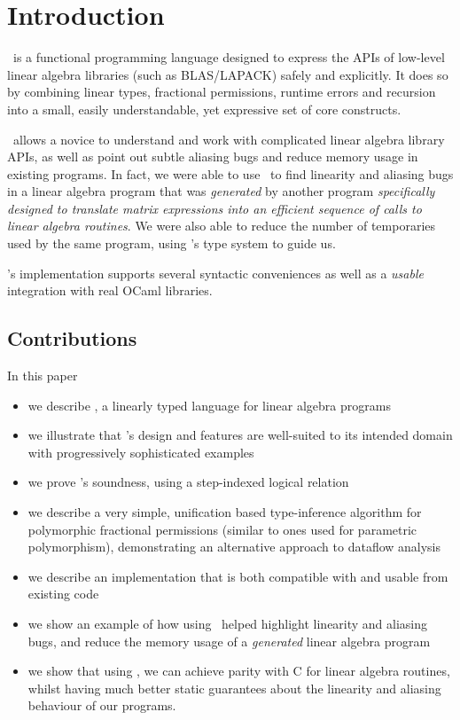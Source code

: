 \section{Introduction}

\lang\ is a functional programming language designed to express the APIs of
low-level linear algebra libraries (such as BLAS/LAPACK) safely and explicitly.
It does so by combining linear types, fractional permissions, runtime errors
and recursion into a small, easily understandable, yet expressive set of core
constructs.

\lang\ allows a novice to understand and work with complicated linear algebra
library APIs, as well as point out subtle aliasing bugs and reduce memory usage
in existing programs. In fact, we were able to use \lang\ to find linearity and
aliasing bugs in a linear algebra program that was \emph{generated} by another
program \emph{specifically designed to translate matrix expressions into an
efficient sequence of calls to linear algebra routines}. We were also able to
reduce the number of temporaries used by the same program, using \lang's type
system to guide us.

\lang's implementation supports several syntactic conveniences as well as a
\emph{usable} integration with real OCaml libraries.

\subsection{Contributions}

In this paper
\begin{itemize}
    \item we describe \lang, a linearly typed language for linear algebra programs
    \item we illustrate that \lang's design and features are well-suited to its
        intended domain with progressively sophisticated examples
    \item we prove \lang's soundness, using a step-indexed logical relation
    \item we describe a very simple, unification based type-inference algorithm
        for polymorphic fractional permissions (similar to ones used for
        parametric polymorphism), demonstrating an alternative approach to
        dataflow analysis \cite{bierhoff}
    \item we describe an implementation that is both compatible with and usable
        from existing code
    \item we show an example of how using \lang\ helped highlight linearity
        and aliasing bugs, and reduce the memory usage of a \emph{generated}
        linear algebra program
    \item we show that using \lang, we can achieve parity with C for linear
        algebra routines, whilst having much better static guarantees about the
        linearity and aliasing behaviour of our programs.
\end{itemize}

